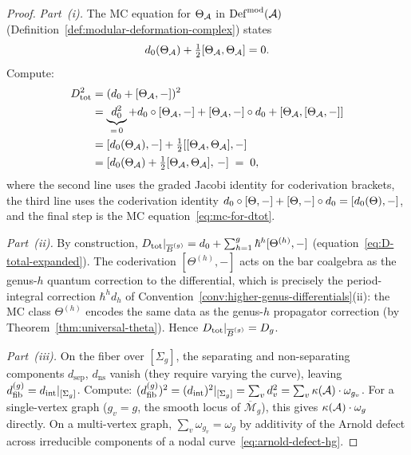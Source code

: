 \begin{proof}
\emph{Part~(i).}
The MC equation for $\Theta_{\mathcal{A}}$ in
$\operatorname{Def}^{\mathrm{mod}}(\mathcal{A})$
(Definition~\ref{def:modular-deformation-complex}) states
\begin{equation}\label{eq:mc-for-dtot}
d_0(\Theta_{\mathcal{A}}) + \tfrac{1}{2}[\Theta_{\mathcal{A}}, \Theta_{\mathcal{A}}] = 0.
\end{equation}
Compute:
\begin{align*}
D_{\mathrm{tot}}^2
&= (d_0 + [\Theta_{\mathcal{A}}, -])^2 \\
&= \underbrace{d_0^2}_{=\,0}
  + d_0 \circ [\Theta_{\mathcal{A}}, -]
  + [\Theta_{\mathcal{A}}, -] \circ d_0
  + [\Theta_{\mathcal{A}}, [\Theta_{\mathcal{A}}, -]] \\
&= [d_0(\Theta_{\mathcal{A}}), -]
  + \tfrac{1}{2}[[\Theta_{\mathcal{A}}, \Theta_{\mathcal{A}}], -] \\
&= [d_0(\Theta_{\mathcal{A}}) + \tfrac{1}{2}[\Theta_{\mathcal{A}}, \Theta_{\mathcal{A}}],\, -]
\;=\; 0,
\end{align*}
where the second line uses the graded Jacobi identity for
coderivation brackets, the third line uses the coderivation identity
$d_0 \circ [\Theta, -] + [\Theta, -] \circ d_0
= [d_0(\Theta), -]$, and the final step is the
MC equation~\eqref{eq:mc-for-dtot}.

\emph{Part~(ii).}
By construction,
$D_{\mathrm{tot}}|_{\overline{B}^{(g)}} = d_0 +
\sum_{h=1}^g \hbar^h [\Theta^{(h)}, -]$
(equation~\eqref{eq:D-total-expanded}).
The coderivation $[\Theta^{(h)}, -]$ acts on the bar coalgebra
as the genus-$h$ quantum correction to the differential,
which is precisely the period-integral correction $\hbar^h d_h$
of Convention~\ref{conv:higher-genus-differentials}(ii):
the MC class $\Theta^{(h)}$ encodes the same data as the
genus-$h$ propagator correction (by
Theorem~\ref{thm:universal-theta}).
Hence $D_{\mathrm{tot}}|_{\overline{B}^{(g)}} = D_{g}$.

\emph{Part~(iii).}
On the fiber over $[\Sigma_g]$, the separating and non-separating
components $d_{\mathrm{sep}}$, $d_{\mathrm{ns}}$ vanish (they
require varying the curve), leaving
$d_{\mathrm{fib}}^{(g)} = d_{\mathrm{int}}|_{[\Sigma_g]}$.  Compute:
$(d_{\mathrm{fib}}^{(g)})^2 = (d_{\mathrm{int}})^2|_{[\Sigma_g]}
= \sum_v d_v^2 = \sum_v \kappa(\mathcal{A}) \cdot \omega_{g_v}$.
For a single-vertex graph ($g_v = g$, the smooth locus of
$\overline{\mathcal{M}}_g$), this gives $\kappa(\mathcal{A}) \cdot
\omega_g$ directly.
On a multi-vertex graph, $\sum_v \omega_{g_v} = \omega_g$ by
additivity of the Arnold defect across irreducible components
of a nodal curve~\eqref{eq:arnold-defect-hg}.
\end{proof}

